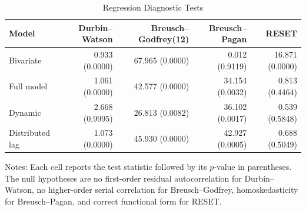 \begin{table}[H]
\centering
\caption{Regression Diagnostic Tests}
\label{tab:diagnostics}
\begin{tabular}{lrrrr}
\toprule
Model & Durbin--Watson & Breusch--Godfrey(12) & Breusch--Pagan & RESET \\
\midrule
Bivariate & 0.933 (0.0000) & 67.965 (0.0000) & 0.012 (0.9119) & 16.871 (0.0000) \\
Full model & 1.061 (0.0000) & 42.577 (0.0000) & 34.154 (0.0032) & 0.813 (0.4464) \\
Dynamic & 2.668 (0.9995) & 26.813 (0.0082) & 36.102 (0.0017) & 0.539 (0.5848) \\
Distributed lag & 1.073 (0.0000) & 45.930 (0.0000) & 42.927 (0.0005) & 0.688 (0.5049) \\
\bottomrule
\end{tabular}
\begin{minipage}{0.95\textwidth}
\vspace{0.4em}\footnotesize Notes: Each cell reports the test statistic followed by its $p$-value in parentheses. The null hypotheses are no first-order residual autocorrelation for Durbin--Watson, no higher-order serial correlation for Breusch--Godfrey, homoskedasticity for Breusch--Pagan, and correct functional form for RESET.
\end{minipage}
\end{table}
